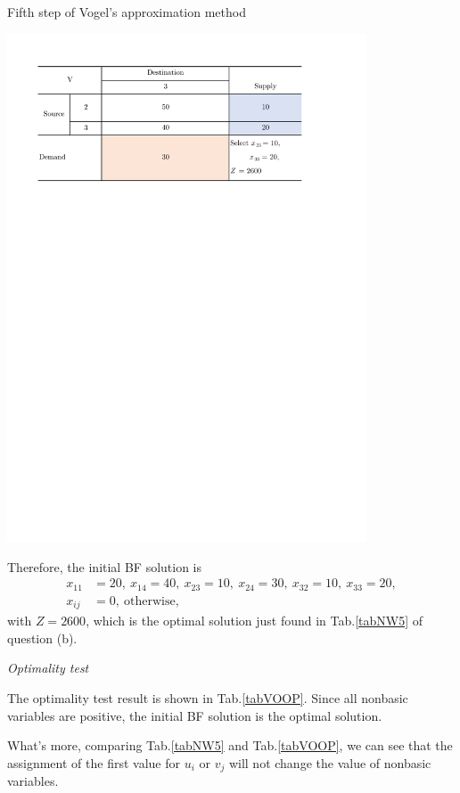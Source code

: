 \documentclass[a4paper]{article}
\begin{document}
\begin{enumerate}
\begin{enumerate}
\begin{solution}
	\begin{table}[H]
		\caption{Fifth step of Vogel's approximation method}
		\label{tabVO5}
		\centering
		\includegraphics[width = 0.8\textwidth]{VO5}				
	\end{table}
	
	Therefore, the initial BF solution is 
	\begin{equation*}
	\begin{aligned}
	x_{11}&=20,\ x_{14}=40,\ x_{23}=10,\ x_{24}=30,\ x_{32}=10,\ x_{33}=20,\\
	x_{ij}&=0,\ \text{otherwise},
	\end{aligned}
	\end{equation*}
	with $Z=2600$, which is the optimal solution just found in Tab.\ref{tabNW5} of question (b).
	
	\newpage
	\textit{Optimality test}
	
	The optimality test result is shown in Tab.\ref{tabVOOP}. Since all nonbasic variables are positive, the initial BF solution is the optimal solution.
	
	\hspace*{4ex}What's more, comparing Tab.\ref{tabNW5} and Tab.\ref{tabVOOP}, we can see that the assignment of the first value for $u_i$ or $v_j$ will not change the value of nonbasic variables.
	

\end{solution}
\end{enumerate}
\end{enumerate}
\end{document}
